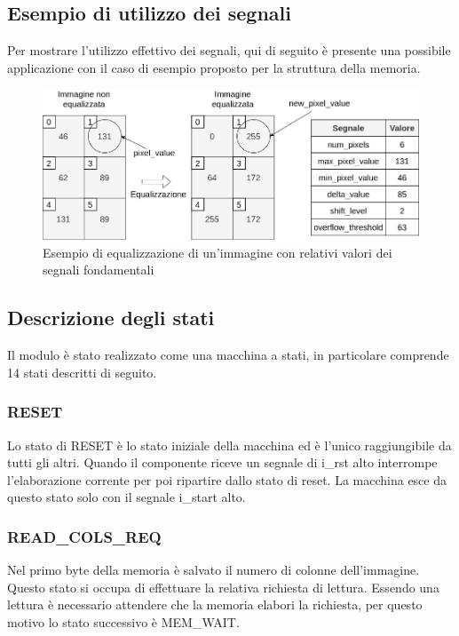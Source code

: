 \documentclass{article}
\begin{document}
\subsection{Esempio di utilizzo dei segnali}
Per mostrare l'utilizzo effettivo dei segnali, qui di seguito è presente una possibile applicazione con il caso di esempio proposto per la struttura della memoria.

\begin{figure}[h]
    \vspace{1cm}
    \includegraphics[width=\textwidth]{example.png}
    \centering
    \caption{Esempio di equalizzazione di un'immagine con relativi valori dei segnali fondamentali}
\end{figure}

\pagebreak

\subsection{Descrizione degli stati}
Il modulo è stato realizzato come una macchina a stati, in particolare comprende 14 stati descritti di seguito.

\subsubsection{RESET}
Lo stato di RESET è lo stato iniziale della macchina ed è l'unico raggiungibile da tutti gli altri. Quando il componente riceve un segnale di i\_rst alto interrompe l'elaborazione corrente per poi ripartire dallo stato di reset. La macchina esce da questo stato solo con il segnale i\_start alto.

\subsubsection{READ\_COLS\_REQ}
Nel primo byte della memoria è salvato il numero di colonne dell'immagine. Questo stato si occupa di effettuare la relativa richiesta di lettura. Essendo una lettura è necessario attendere che la memoria elabori la richiesta, per questo motivo lo stato successivo è MEM\_WAIT.
\end{document}
